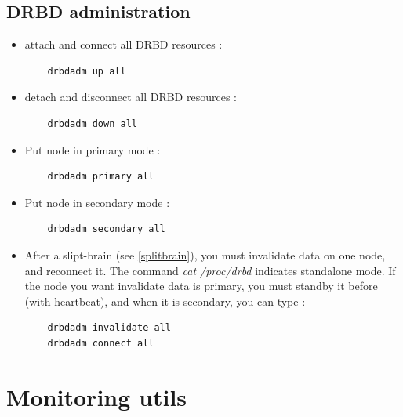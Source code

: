 \documentclass[a4paper,10pt]{report}
\begin{document}
\subsection{DRBD administration}
\label{drbd-admn}
\begin{itemize}
 \item attach and connect all DRBD resources :
    \begin{lstlisting}
    drbdadm up all
    \end{lstlisting}
\item detach and disconnect all DRBD resources :
    \begin{lstlisting}
    drbdadm down all
    \end{lstlisting}

\item Put node in primary mode :
    \begin{lstlisting}
    drbdadm primary all
    \end{lstlisting}

\item Put node in secondary mode :
    \begin{lstlisting}
    drbdadm secondary all
    \end{lstlisting}

\item After a slipt-brain (see \ref{splitbrain}), you must invalidate data on one node, and reconnect it. The command \textit{cat /proc/drbd} indicates standalone mode. If the node you want invalidate data is primary, you must standby it before (with heartbeat), and when it is secondary, you can type :
    \begin{lstlisting}
    drbdadm invalidate all
    drbdadm connect all
    \end{lstlisting}

\end{itemize}




\section{Monitoring utils}
\end{document}
